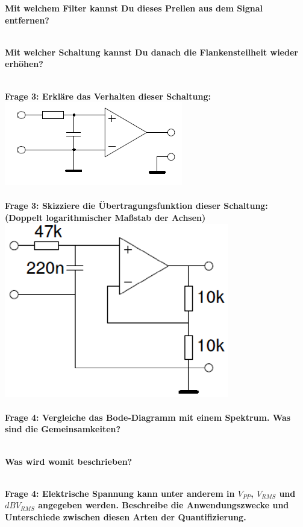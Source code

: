 \documentclass[11pt,a4paper]{scrartcl}
\begin{document}
\textbf{Mit welchem Filter kannst Du dieses Prellen aus dem Signal entfernen?}

\\

\textbf{Mit welcher Schaltung kannst Du danach die Flankensteilheit wieder erhöhen?}

\\

\textbf{Frage 3: Erkläre das Verhalten dieser Schaltung:}\\
\includegraphics{Schaltung_1.png}\\
\\

\textbf{Frage 3: Skizziere die Übertragungsfunktion dieser Schaltung:\\
(Doppelt logarithmischer Maßstab der Achsen)}\\
\includegraphics{Schaltung_2.png}\\
\\

\textbf{Frage 4: Vergleiche das Bode‐Diagramm mit einem Spektrum. Was sind die Gemeinsamkeiten?}

\\

\textbf{Was wird womit beschrieben?}

\\

\textbf{Frage 4: Elektrische Spannung kann unter anderem in $V_{PP}$, $V_{RMS}$ und $dBV_{RMS}$ angegeben werden. Beschreibe die Anwendungszwecke und Unterschiede zwischen diesen Arten der Quantifizierung.}\\
\end{document}
